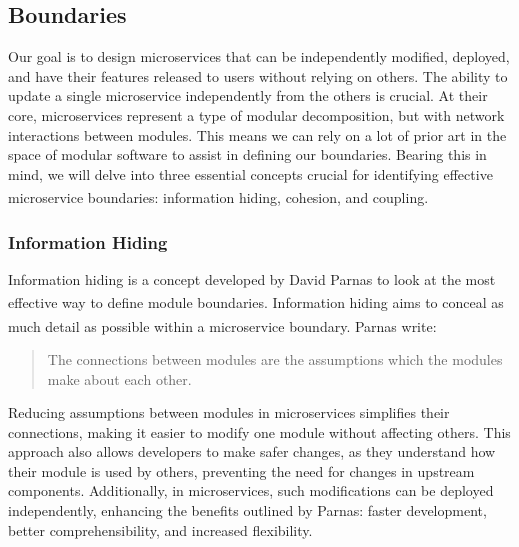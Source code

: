 \subsection{Boundaries}
Our goal is to design microservices that can be independently modified, deployed, and have their
features released to users without relying on others. The ability to update a single microservice
independently from the others is crucial. At their core, microservices represent a type of modular
decomposition, but with network interactions between modules. This means we can rely on a lot of
prior art in the space of modular software to assist in defining our boundaries. Bearing this in
mind, we will delve into three essential concepts crucial for identifying effective microservice
boundaries: information hiding, cohesion, and coupling\textsuperscript{\cite{microservices_book}}.

\subsubsection{Information Hiding}
Information hiding is a concept developed by David Parnas to look at the most effective way to
define module boundaries\textsuperscript{\cite{microservices_model_1}}. Information hiding aims to
conceal as much detail as possible within a microservice boundary. Parnas
write\textsuperscript{\cite{microservices_model_2}}:

\begin{quote}
    The connections between modules are the assumptions which the modules make about each other.
\end{quote}

Reducing assumptions between modules in microservices simplifies their connections, making it easier
to modify one module without affecting others. This approach also allows developers to make safer
changes, as they understand how their module is used by others, preventing the need for changes in
upstream components. Additionally, in microservices, such modifications can be deployed
independently, enhancing the benefits outlined by Parnas: faster development, better
comprehensibility, and increased flexibility.


